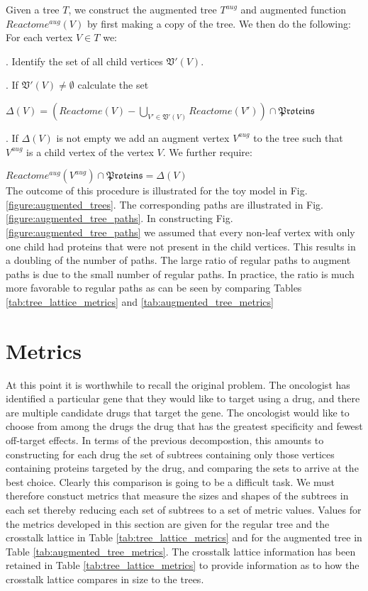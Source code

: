 \documentclass{article}
\begin{document}
Given a tree $T$, we construct the augmented tree $T^{aug}$ and augmented function $Reactome^{aug}(V)$ by first making a copy of the tree. We then do the following: \\

\noindent For each vertex $V \in T$ we:

. Identify the set of all child vertices $\mathfrak V'(V)$.

. If $\mathfrak V'(V) \neq \emptyset$ calculate the set

$\Delta(V) = \left( Reactome(V) - \bigcup_{V' \in \mathfrak{V}'(V)} Reactome(V') \right) \cap \mathfrak{Proteins}$

. If $\Delta(V)$ is not empty we add an augment vertex $V^{aug}$ to the tree such that $V^{aug}$ is a child vertex of the vertex $V$. We further require:

$Reactome^{aug}(V^{aug}) \cap \mathfrak{Proteins} = \Delta(V)$ \\

\noindent The outcome of this procedure is illustrated for the toy model in Fig. \ref{figure:augmented_trees}. The corresponding paths are illustrated in Fig. \ref{figure:augmented_tree_paths}. In constructing Fig.\ref{figure:augmented_tree_paths} we assumed that every non-leaf vertex with only one child had proteins that were not present in the child vertices. This results in a doubling of the number of paths. The large ratio of regular paths to augment paths is due to the small number of regular paths. In practice, the ratio is much more favorable to regular paths as can be seen by comparing Tables \ref{tab:tree_lattice_metrics} and \ref{tab:augmented_tree_metrics}

\section{Metrics}
\label{section:metrics}

At this point it is worthwhile to recall the original problem. The oncologist has identified a particular gene that they would like to target using a drug, and there are multiple candidate drugs that target the gene. The oncologist would like to choose from among the drugs the drug that has the greatest specificity and fewest off-target effects. In terms of the previous decompostion, this amounts to constructing for each drug the set of subtrees containing only those vertices containing proteins targeted by the drug, and comparing the sets to arrive at the best choice. Clearly this comparison is going to be a difficult task. We must therefore constuct metrics that measure the sizes and shapes of the subtrees in each set thereby reducing each set of subtrees to a set of metric values. Values for the metrics developed in this section are given for the regular tree and the crosstalk lattice in Table \ref{tab:tree_lattice_metrics} and for the augmented tree in Table \ref{tab:augmented_tree_metrics}. The crosstalk lattice information has been retained in Table \ref{tab:tree_lattice_metrics} to provide information as to how the crosstalk lattice compares in size to the trees.
\end{document}
